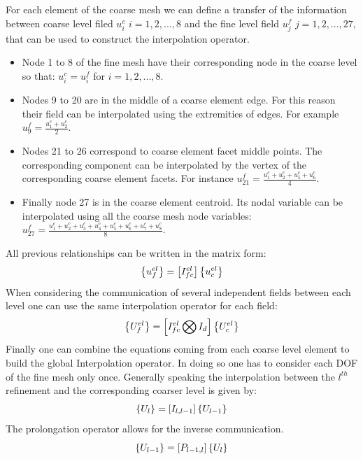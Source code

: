      For each element of the coarse mesh we can define a transfer of the information between coarse level filed $u^c_i$ $i=1,2,...,8$ and the fine level field $u^f_j$ $j=1,2,...,27$, that can be used to construct the interpolation operator. 
     \begin{itemize}
     \item Node 1 to 8 of the fine mesh have their corresponding node in the coarse level so that: $u^c_i=u^f_i$ for $i=1,2,...,8$.
     \item Nodes 9 to 20 are in the middle of a coarse element edge. For this reason their field can be interpolated using the extremities of edges. For example $u^f_9=\frac{u^c_1+u^c_2}{2}$.
     \item Nodes 21 to 26 correspond to coarse element facet middle points. The corresponding component can be interpolated by the vertex of the corresponding coarse element facets. For instance $u^f_{21}=\frac{u^c_1+u^c_2+u^c_5+u^c_6}{4}$.
     \item Finally node 27 is in the coarse element centroid. Its nodal variable can be interpolated using all the coarse mesh node variables: $u^f_{27}=\frac{u^c_1+u^c_2+u^c_3+u^c_4+u^c_5+u^c_6+u^c_7+u^c_8}{8}$.
     \end{itemize}
        All previous relationships can be written in the matrix form: 
     \begin{equation}
     \left\lbrace{u_f^{el}}\right \rbrace=\left[{I_{fc}^{el}}\right]\left\lbrace{u_c^{el}}\right \rbrace
     \end{equation}
     When considering the communication of several independent fields between each level one can use the same interpolation operator for each field:
     \begin{equation}
     \left\lbrace{U_f^{el}}\right \rbrace=\left[{I_{fc}^{el}\bigotimes I_d}\right]\left\lbrace{U_c^{el}}\right \rbrace
     \end{equation}
     Finally one can combine the equations coming from each coarse level element to build the global Interpolation operator. In doing so one has to consider each DOF of the fine mesh only once. Generally speaking the interpolation between the $l^{th}$ refinement and the corresponding coarser level is given by: 
      \begin{equation}
      \left\lbrace{U_l}\right \rbrace=\left[{I_{l,l-1}}\right]\left\lbrace{U_{l-1}}\right \rbrace
      \end{equation}
      The prolongation operator allows for the inverse communication.  
 \begin{equation}
       \left\lbrace{U_{l-1}}\right \rbrace=\left[{P_{l-1,l}}\right]\left\lbrace{U_{l}}\right \rbrace
 \end{equation}
